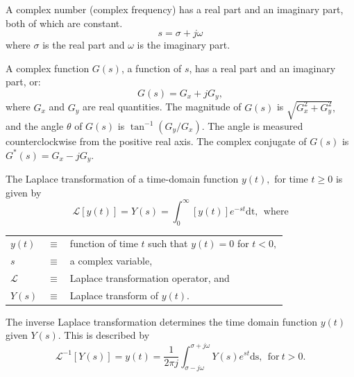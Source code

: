   \begin{definition}
    A complex number (complex frequency) has a real part and an imaginary part, both
    of which are constant.
    $$s = \sigma + j\omega$$
    where $\sigma$ is the real part and $\omega$ is the imaginary part. 
  \end{definition}
  \begin{definition}
A complex function $G(s)$, a function of $s$, has a real part and an imaginary part, or: 
$$G(s) = G_x + jG_y,$$
where $G_x$ and $G_y$ are real quantities. The magnitude of $G(s)$ is $\sqrt{G_x^2+G_y^2},$ and the angle $\theta$ of $G(s)$ is $\tan^{-1}(G_y/G_x)$. The angle is measured counterclockwise from the positive real axis. The complex conjugate of $G(s)$ is $G^*(s) = G_x-jG_y.$ 
\end{definition}

\begin{definition}
  The Laplace transformation of a time-domain function $y(t),$ for time $t\ge 0$ is given by %
  \begin{equation*}
\mathscr{L}\left[y(t)\right]  = Y(s) =\int_0^\infty \left[y(t)\right]e^{-st} \mathrm{dt},~~\text{where}
  \end{equation*}
\begin{tabular}{lll}
$y(t)$   & $\equiv$ & function of time $t$ such that $y(t)=0$ for $t<0,$\\
$s$&$\equiv$&a complex variable,\\
$\mathscr{L}$&$\equiv$& Laplace transformation operator, and \\
$Y(s)$&$\equiv$&Laplace transform of $y(t).$
\end{tabular}    
  \end{definition}
  \begin{definition}
    The inverse Laplace transformation determines the time domain function $y(t)$ given $Y(s).$ This is described by %
    \begin{equation*}
      \mathscr{L}^{-1}\left[Y(s)\right]  = y(t) =  \frac{1}{2\pi j}\int_{\sigma -j\omega}^{\sigma +j\omega} Y(s)e^{st} \mathrm{ds},~~\text{for}~t > 0.
    \end{equation*}
  \end{definition}

